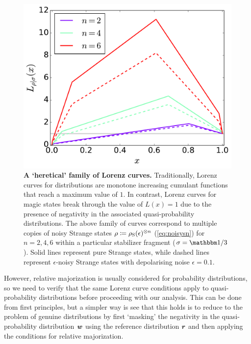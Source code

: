 \documentclass[pra,
aps,
twocolumn,
superscriptaddress,
groupedaddress,
nofootinbib,
reprint
]{revtex4-1}
\begin{document}
\begin{figure}
    \centering
    \includegraphics[scale=0.35]{figs/lc_strange.pdf}
    \caption{\textbf{A `heretical' family of Lorenz curves.} Traditionally, Lorenz curves for distributions are monotone increasing cumulant functions that reach a maximum value of $1$. In contrast, Lorenz curves for magic states break through the value of $L(x)=1$ due to the presence of negativity in the associated quasi-probability distributions. The above family of curves correspond to multiple copies of noisy Strange states $\rho\coloneqq\rho_{\rm{S}}(\epsilon)^{\otimes n}$ (\cref{eq:noisysn}) for $n=2,4,6$ within a particular stabilizer fragment ($\sigma = \id/3$). Solid lines represent pure Strange states, while dashed lines represent $\epsilon$-noisy Strange states with depolarising noise $\epsilon = 0.1$.
    }
    \label{fig:lcs}
\end{figure}

However, relative majorization is usually considered for probability distributions, so we need to verify that the same Lorenz curve conditions apply to quasi-probability distributions before proceeding with our analysis. This can be done from first principles, but a simpler way is see that this holds is to reduce to the problem of genuine distributions by first `masking' the negativity in the quasi-probability distribution $\boldsymbol{w}$ using the reference distribution $\boldsymbol{r}$ and then applying the conditions for relative majorization. 
 
\end{document}
